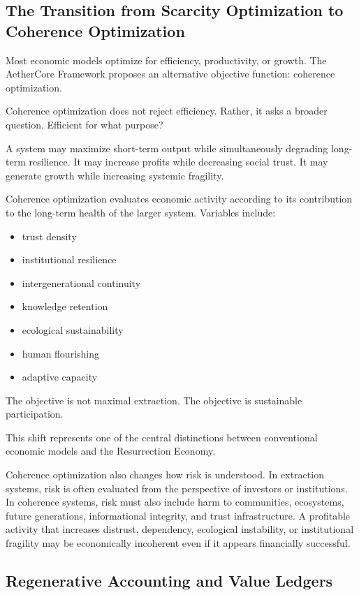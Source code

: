 \documentclass[12pt]{article}
\begin{document}
\subsection{The Transition from Scarcity Optimization to Coherence Optimization}

Most economic models optimize for efficiency, productivity, or growth. The AetherCore Framework proposes an alternative objective function: coherence optimization.

Coherence optimization does not reject efficiency. Rather, it asks a broader question. Efficient for what purpose?

A system may maximize short-term output while simultaneously degrading long-term resilience. It may increase profits while decreasing social trust. It may generate growth while increasing systemic fragility.

Coherence optimization evaluates economic activity according to its contribution to the long-term health of the larger system. Variables include:

\begin{itemize}
  \item trust density
  \item institutional resilience
  \item intergenerational continuity
  \item knowledge retention
  \item ecological sustainability
  \item human flourishing
  \item adaptive capacity
\end{itemize}

The objective is not maximal extraction. The objective is sustainable participation.

This shift represents one of the central distinctions between conventional economic models and the Resurrection Economy.

Coherence optimization also changes how risk is understood. In extraction systems, risk is often evaluated from the perspective of investors or institutions. In coherence systems, risk must also include harm to communities, ecosystems, future generations, informational integrity, and trust infrastructure. A profitable activity that increases distrust, dependency, ecological instability, or institutional fragility may be economically incoherent even if it appears financially successful.

\subsection{Regenerative Accounting and Value Ledgers}
\end{document}
